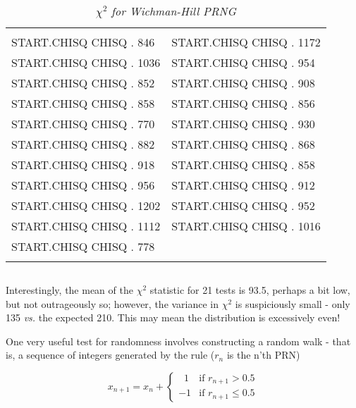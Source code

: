 \begin{table}
    \caption{\textit{$\chi^2$ for Wichman-Hill PRNG}}
    \label{tbl:03_02}
        \setlength{\tabcolsep}{20pt}
        \begin{tabular}{|ll|}
            \hline & \\
            START.CHISQ CHISQ . 846   &  START.CHISQ CHISQ . 1172  \\ 
            START.CHISQ CHISQ . 1036  &  START.CHISQ CHISQ . 954   \\
            START.CHISQ CHISQ . 852   &  START.CHISQ CHISQ . 908   \\
            START.CHISQ CHISQ . 858   &  START.CHISQ CHISQ . 856   \\
            START.CHISQ CHISQ . 770   &  START.CHISQ CHISQ . 930   \\
            START.CHISQ CHISQ . 882   &  START.CHISQ CHISQ . 868   \\
            START.CHISQ CHISQ . 918   &  START.CHISQ CHISQ . 858   \\
            START.CHISQ CHISQ . 956   &  START.CHISQ CHISQ . 912   \\
            START.CHISQ CHISQ . 1202  &  START.CHISQ CHISQ . 952   \\
            START.CHISQ CHISQ . 1112  &  START.CHISQ CHISQ . 1016  \\
            START.CHISQ CHISQ . 778   & \\
            & \\
            \hline
        \end{tabular} 
\end{table}

\begin{lstlisting}
\end{lstlisting} 
 
Interestingly, the mean of the $\chi^2$ statistic for 21 tests is 93.5, perhaps a bit low, but not outrageously so; however, the variance in $\chi^2$ is suspiciously small - only 135 \textit{vs.} the expected 210. This may mean the distribution is excessively even!

One very useful test for randomness involves constructing a random walk - that is, a sequence of integers generated by the rule ($r_n$ is the n'th PRN)

\begin{equation}
x_{n+1}=x_n+
\begin{cases}
    \;\; 1 & \text{if } r_{n+1} > 0.5 \\
        -1 & \text{if } r_{n+1} \leq 0.5
    \end{cases}
\end{equation}

